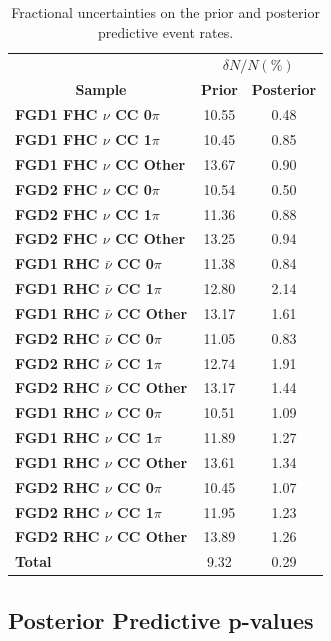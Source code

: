 \begin{center}
\begin{table}[!htbp]
\center
\begin{tabular}{l||c c}
\hline \hline
& \multicolumn{2}{c}{$\delta N/N(\%)$}\\
\multicolumn{1}{c||}{\textbf{Sample}} & \multicolumn{1}{c}{\textbf{Prior}} & \multicolumn{1}{c}{\textbf{Posterior}} \\
\hline\hline
\textbf{FGD1 FHC $\nu$ CC 0$\pi$} & 10.55 & 0.48\\
\textbf{FGD1 FHC $\nu$ CC 1$\pi$} & 10.45 & 0.85\\ 
\textbf{FGD1 FHC $\nu$ CC Other} & 13.67 & 0.90\\ \hline
\textbf{FGD2 FHC $\nu$ CC 0$\pi$} & 10.54 & 0.50\\
\textbf{FGD2 FHC $\nu$ CC 1$\pi$} & 11.36 & 0.88\\
\textbf{FGD2 FHC $\nu$ CC Other} & 13.25 & 0.94\\ \hline
\textbf{FGD1 RHC $\bar{\nu}$ CC 0$\pi$} & 11.38 & 0.84\\
\textbf{FGD1 RHC $\bar{\nu}$ CC 1$\pi$} & 12.80 & 2.14\\
\textbf{FGD1 RHC $\bar{\nu}$ CC Other} & 13.17 & 1.61\\ \hline
\textbf{FGD2 RHC $\bar{\nu}$ CC 0$\pi$} & 11.05 & 0.83\\
\textbf{FGD2 RHC $\bar{\nu}$ CC 1$\pi$} & 12.74 & 1.91\\
\textbf{FGD2 RHC $\bar{\nu}$ CC Other} & 13.17 & 1.44\\ \hline
\textbf{FGD1 RHC $\nu$ CC 0$\pi$} & 10.51 & 1.09\\
\textbf{FGD1 RHC $\nu$ CC 1$\pi$} & 11.89 & 1.27\\
\textbf{FGD1 RHC $\nu$ CC Other} & 13.61 & 1.34\\ \hline
\textbf{FGD2 RHC $\nu$ CC 0$\pi$} & 10.45 & 1.07\\
\textbf{FGD2 RHC $\nu$ CC 1$\pi$} & 11.95 & 1.23\\ 
\textbf{FGD2 RHC $\nu$ CC Other} & 13.89 & 1.26\\ \hline
\textbf{Total} & 9.32 & 0.29 \\ \hline\hline
\end{tabular}
\caption{Fractional uncertainties on the prior and posterior predictive event rates.}
\label{tab:prederr}
\end{table}
\end{center}

\subsection{Posterior Predictive p-values}

